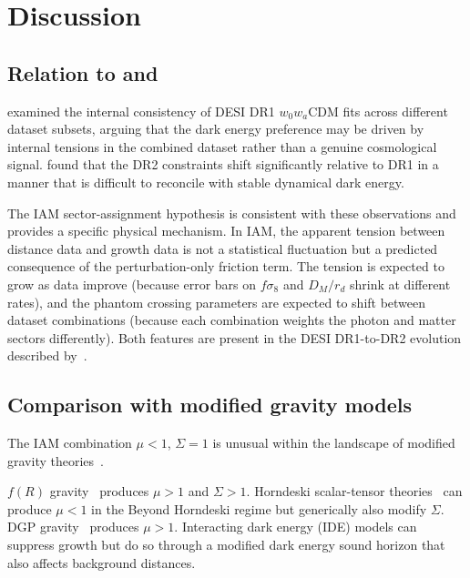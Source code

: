\documentclass[12pt,a4paper]{article}
\begin{document}
\section{Discussion}
\label{sec:discussion}

\subsection{Relation to \citet{Ocolgain2024} and \citet{Ocolgain2025}}
\label{sec:ocolgain}

\citet{Ocolgain2024} examined the internal consistency of DESI DR1
$w_0 w_a$CDM fits across different dataset subsets, arguing that the
dark energy preference may be driven by internal tensions in the combined
dataset rather than a genuine cosmological signal.
\citet{Ocolgain2025} found that the DR2 constraints shift significantly
relative to DR1 in a manner that is difficult to reconcile with stable
dynamical dark energy.

The IAM sector-assignment hypothesis is consistent with these observations
and provides a specific physical mechanism.
In IAM, the apparent tension between distance data and growth data is not
a statistical fluctuation but a predicted consequence of the perturbation-only
friction term.
The tension is expected to grow as data improve (because error bars on
$f\sigma_8$ and $D_M/r_d$ shrink at different rates), and the phantom
crossing parameters are expected to shift between dataset combinations
(because each combination weights the photon and matter sectors differently).
Both features are present in the DESI DR1-to-DR2 evolution described
by~\citet{Ocolgain2025}.

\subsection{Comparison with modified gravity models}
\label{sec:mg}

The IAM combination $\mu < 1$, $\Sigma = 1$ is unusual within the
landscape of modified gravity theories~\citep{Pogosian2016}.

$f(R)$ gravity~\citep{Hu2007fR} produces $\mu > 1$ and $\Sigma > 1$.
Horndeski scalar-tensor theories~\citep{Bellini2014} can produce $\mu < 1$
in the Beyond Horndeski regime but generically also modify $\Sigma$.
DGP gravity~\citep{Dvali2000} produces $\mu > 1$.
Interacting dark energy (IDE) models can suppress growth but do so through
a modified dark energy sound horizon that also affects background distances.
\end{document}
